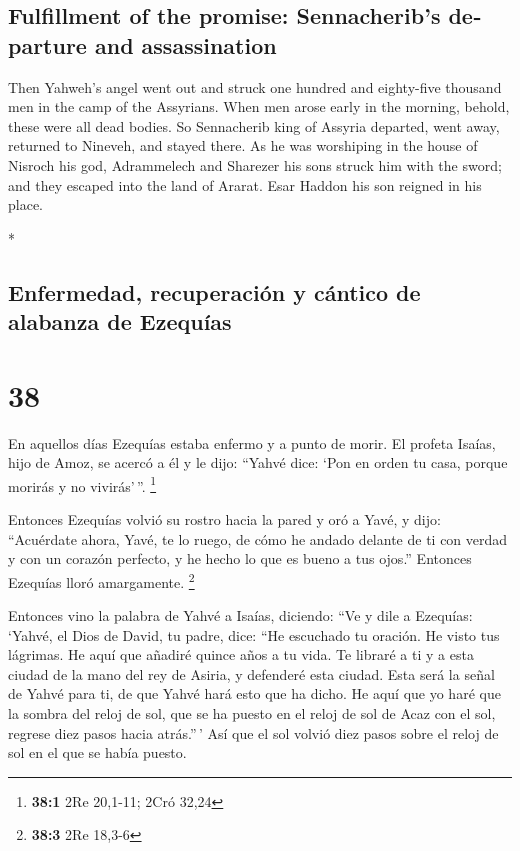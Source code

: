 \begin{paracol}{2}
\begin{otherlanguage}{english}
\hypertarget{fulfillment-of-the-promise-sennacheribs-departure-and-assassination}{%
\subsection{Fulfillment of the promise: Sennacherib's departure and
assassination}\label{fulfillment-of-the-promise-sennacheribs-departure-and-assassination}}

 Then Yahweh's angel went out and struck one hundred and
eighty-five thousand men in the camp of the Assyrians. When men arose
early in the morning, behold, these were all dead bodies.
 So Sennacherib king of Assyria departed, went away,
returned to Nineveh, and stayed there.  As he was
worshiping in the house of Nisroch his god, Adrammelech and Sharezer his
sons struck him with the sword; and they escaped into the land of
Ararat. Esar Haddon his son reigned in his place.

\end{otherlanguage}

\switchcolumn[0]*

\hypertarget{enfermedad-recuperaciuxf3n-y-cuxe1ntico-de-alabanza-de-ezequuxedas}{%
\subsection{Enfermedad, recuperación y cántico de alabanza de
Ezequías}\label{enfermedad-recuperaciuxf3n-y-cuxe1ntico-de-alabanza-de-ezequuxedas}}

\hypertarget{section-74}{%
\section{38}\label{section-74}}

 En aquellos días Ezequías estaba enfermo y a punto de
morir. El profeta Isaías, hijo de Amoz, se acercó a él y le dijo:
``Yahvé dice: `Pon en orden tu casa, porque morirás y no vivirás'\,''.
\footnote{\textbf{38:1} 2Re 20,1-11; 2Cró 32,24}

 Entonces Ezequías volvió su rostro hacia la pared y oró a
Yavé,  y dijo: ``Acuérdate ahora, Yavé, te lo ruego, de
cómo he andado delante de ti con verdad y con un corazón perfecto, y he
hecho lo que es bueno a tus ojos.'' Entonces Ezequías lloró amargamente.
\footnote{\textbf{38:3} 2Re 18,3-6}

 Entonces vino la palabra de Yahvé a Isaías, diciendo:
 ``Ve y dile a Ezequías: `Yahvé, el Dios de David, tu
padre, dice: ``He escuchado tu oración. He visto tus lágrimas. He aquí
que añadiré quince años a tu vida.  Te libraré a ti y a
esta ciudad de la mano del rey de Asiria, y defenderé esta ciudad.
 Esta será la señal de Yahvé para ti, de que Yahvé hará
esto que ha dicho.  He aquí que yo haré que la sombra del
reloj de sol, que se ha puesto en el reloj de sol de Acaz con el sol,
regrese diez pasos hacia atrás.''\,' Así que el sol volvió diez pasos
sobre el reloj de sol en el que se había puesto.


\end{paracol}
